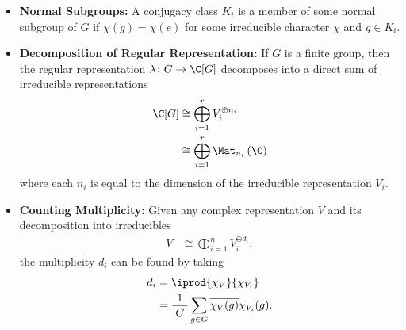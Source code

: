 \documentclass[10pt]{mypackage}
\begin{document}
\begin{itemize}
  \item \textbf{Normal Subgroups:} A conjugacy class $K_i$ is a member of some normal subgroup of $G$ if $\chi(g) = \chi(e)$ for some irreducible character $\chi$ and $g\in K_i$.
  \item \textbf{Decomposition of Regular Representation:} If $G$ is a finite group, then the regular representation $\lambda\colon G\rightarrow \C[G]$ decomposes into a direct sum of irreducible representations
    \begin{align*}
      \C[G] &\cong \bigoplus_{i=1}^{r} V_i^{\oplus n_i}\\
                                    &\cong \bigoplus_{i=1}^{r} \Mat_{n_i}\left( \C \right)
    \end{align*}
    where each $n_i$ is equal to the dimension of the irreducible representation $V_i$.
  \item \textbf{Counting Multiplicity:} Given any complex representation $V$ and its decomposition into irreducibles
    \begin{align*}
      V &\cong \bigoplus_{i=1}^{n}V_i^{\oplus d_i},
    \end{align*}
    the multiplicity $d_i$ can be found by taking
    \begin{align*}
      d_i &= \iprod{\chi_V}{\chi_{V_i}}\\
          &= \frac{1}{\left\vert G \right\vert} \sum_{g\in G} \overline{\chi_V(g)} \chi_{V_i}(g).
    \end{align*}
\end{itemize}
\end{document}
